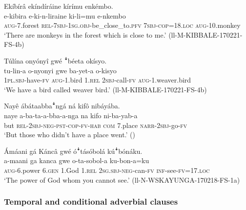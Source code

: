 \documentclass[output=paper,colorlinks,citecolor=brown,draftmode]{langscibook}
\begin{document}
\ea \label{ex:relative}\label{ex:ruulietal:27}
\begin{xlist}
\ex \label{ex:relativesbj}\label{ex:ruulietal:27a}
	\glll   Ekíbírâ ekíndíráine kírímu enkémbo.\\
	        e-kibira e-ki-n-liraine ki-li=mu e-nkembo\\
	    	\textsc{aug}-7.forest \textsc{rel}-\textsc{7sbj}-\textsc{1sg.obj}-be\_close\_to.\textsc{pfv} \textsc{7sbj}-\textsc{cop}=18.\textsc{loc} \textsc{aug}-10.monkey\\
    \glt ‘There are monkeys in the forest which is close to me.’ (ll-M-KIBBALE-170221-FS-4b)

\ex \label{ex:relativeobj}\label{ex:ruulietal:27b}
	\glll    Túlína onyónyî gwé ꜜbéeta okísyo.\\
	        tu-lin-a o-nyonyi gwe ba-yet-a o-kisyo\\
	    	1\textsc{pl.sbj}-have-\textsc{fv} \textsc{aug}-1.bird 1.\textsc{rel} 2\textsc{sbj}-call-\textsc{fv} \textsc{aug}-1.weaver.bird\\
    \glt `We have a bird called weaver bird.' (ll-M-KIBBALE-170221-FS-4b)

\ex \label{ex:relativesbjneg}\label{ex:ruulietal:27c}
	\glll  Nayê ábátaabbaꜜngá ná kifô  nibáyába.\\
	        naye a-ba-ta-a-bba-a-nga na kifo ni-ba-yab-a\\
	    	but \textsc{rel}-2\textsc{sbj}-\textsc{neg}-\textsc{pst}-\textsc{cop}-\textsc{fv}-\textsc{hab} \textsc{com} 7.place \textsc{narr}-2\textsc{sbj}-go-\textsc{fv}\\
    \glt ‘But those who didn't have a place went.’ (\citealt[100]{NamyaloEtAl2021})

\ex \label{ex:relativeobjneg}\label{ex:ruulietal:27d}
	\glll  Ámáani gá Káncâ gwé óꜜtásóbolá kúꜜbónáku.\\
	        a-maani ga kanca gwe o-ta-sobol-a  ku-bon-a=ku\\ 
	    	\textsc{aug}-6.power 6.\textsc{gen} 1.God 1.\textsc{rel} \textsc{2sg.sbj}-\textsc{neg}-can-\textsc{fv} \textsc{inf}-see-\textsc{fv}=17.\textsc{loc}\\
    \glt `The power of God whom you cannot see.' (ll-N-WSKAYUNGA-170218-FS-1a)
\end{xlist}
\z

\subsubsection{Temporal and conditional adverbial clauses}
\label{sec:nonmaintemporal}
\end{document}

